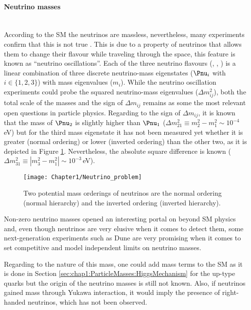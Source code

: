 \paragraph{Neutrino masses}\mbox{}\\
According to the SM the neutrinos are massless, nevertheless, many experiments confirm that this is not 
true \cite{KATRIN:2021uub}. This is due to a property of neutrinos that allows them to change their flavour 
while traveling through the space, this feature is known as ``neutrino oscillations''. Each of the three neutrino flavours
(\Pnue, \Pnum, \Pnut)
is a linear combination of three discrete neutrino-mass eigenstates ($\Pnu_{i}$ with $i\in\{1,2,3\}$) with mass eigenvalues 
($m_i$). While the neutrino oscillation experiments could probe the squared neutrino-mass eigenvalues 
($\Delta m^{2}_{ij}$), both the total scale of the masses and the sign of $\Delta m_{ij}$ remains as some the most 
relevant open questions in particle physics. Regarding to the sign of $\Delta m_{ij}$, it is known that the mass of 
$\Pnu_{2}$ is slightly higher than $\Pnu_{1}$ ($\Delta m^{2}_{21}\equiv m^{2}_{2} - m^{2}_{1} \sim 10^{-4}\,$eV) but 
for the third mass eigenstate it has not been measured yet whether it is greater (normal ordering) or lower (inverted 
ordering) than the other two, as it is depicted in Figure \ref{fig:Chap1:Neutrino_problem}. Nevertheless, 
the absolute square difference is known ($\Delta m^{2}_{31}\equiv |m^{2}_{3} - m^{2}_{1}| \sim 10^{-3}\,$eV). 


\begin{figure}
    \centering
    \texttt{[image: Chapter1/Neutrino\_problem]}
    \caption{Two potential mass orderings of neutrinos are the normal ordering (normal hierarchy) and the inverted ordering (inverted hierarchy).}
    \label{fig:Chap1:Neutrino_problem}
\end{figure}

Non-zero neutrino masses opened an interesting portal on beyond SM physics and, even though neutrinos are very elusive when it comes to detect them, some 
next-generation experiments such as Dune are very promising when it comes to set competitive and model independent limits on neutrino masses. 

Regarding to the nature of this mass, one could add mass terms to the SM as it is done in Section \ref{sec:chap1:ParticleMasses:HiggsMechanism} 
for the up-type quarks but the origin of the neutrino masses is still not known. 
Also, if neutrinos gained mass through Yukawa interaction, it would imply the presence of right-handed neutrinos, 
which has not been observed.

